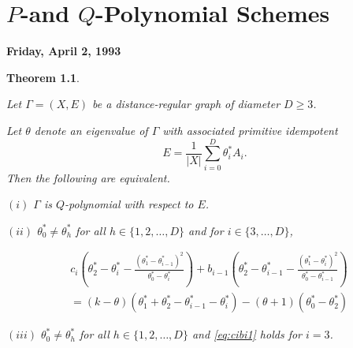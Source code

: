 \documentclass[
]{book}
\newtheorem{theorem}{Theorem}[chapter]
\theoremstyle{definition}
\theoremstyle{definition}
\theoremstyle{definition}
\theoremstyle{definition}
\theoremstyle{remark}
\begin{document}
\hypertarget{lec27}{%
\chapter{\texorpdfstring{\(P\)-and \(Q\)-Polynomial Schemes}{P-and Q-Polynomial Schemes}}\label{lec27}}

\textbf{Friday, April 2, 1993}

\begin{theorem}
\protect\hypertarget{thm:p-and-q}{}\label{thm:p-and-q}

Let \(\Gamma = (X,E)\) be a distance-regular graph of diameter \(D\geq 3\).

Let \(\theta\) denote an eigenvalue of \(\Gamma\) with associated primitive idempotent
\[E = \frac{1}{|X|}\sum_{i=0}^D \theta^*_iA_i.\]
Then the following are equivalent.

\((i)\) \(\Gamma\) is \(Q\)-polynomial with respect to \(E\).

\((ii)\) \(\theta^*_0\neq \theta^*_h\) for all \(h\in \{1, 2, \ldots, D\}\) and for \(i\in \{3, \ldots, D\}\),

\begin{align}
& c_i\left(\theta^*_2 - \theta^*_i - \frac{(\theta^*_1-\theta^*_{i-1})^2}{\theta^*_0-\theta^*_i}\right) + b_{i-1}\left(\theta^*_2 - \theta^*_{i-1} - \frac{(\theta^*_1-\theta^*_{i})^2}{\theta^*_0-\theta^*_{i-1}}\right)\\
& = (k-\theta)(\theta^*_1+\theta^*_2-\theta^*_{i-1}-\theta^*_i)-(\theta+1)(\theta^*_0-\theta^*_2) \label{eq:cibi1}
\end{align}

\((iii)\) \(\theta^*_0\neq \theta^*_h\) for all \(h\in \{1, 2, \ldots, D\}\) and \eqref{eq:cibi1} holds for \(i=3\).

\end{theorem}
\end{document}
